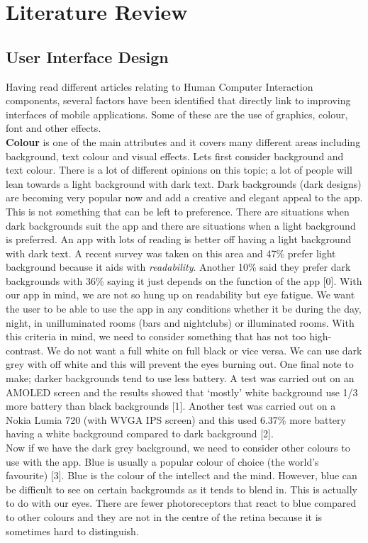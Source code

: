 \section{Literature Review}

\subsection{User Interface Design}
Having read different articles relating to Human Computer Interaction components, several factors have been identified that directly link to improving interfaces of mobile applications.  Some of these are the use of graphics, colour, font and other effects.  \\
\textbf{Colour} is one of the main attributes and it covers many different areas including background, text colour and visual effects.  Lets first consider background and text colour.  There is a lot of different opinions on this topic; a lot of people will lean towards a light background with dark text.  Dark backgrounds (dark designs) are becoming very popular now and add a creative and elegant appeal to the app.  This is not something that can be left to preference.  There are situations when dark backgrounds suit the app and there are situations when a light background is preferred.  An app with lots of reading is better off having a light background with dark text.  A recent survey was taken on this area and 47\% prefer light background because it aids with \emph{readability}.   Another 10\% said they prefer dark backgrounds with 36\% saying it just depends on the function of the app [0].  With our app in mind, we are not so hung up on readability but eye fatigue.  We want the user to be able to use the app in any conditions whether it be during the day, night, in unilluminated rooms (bars and nightclubs) or illuminated rooms.  With this criteria in mind, we need to consider something that has not too high-contrast.  We do not want a full white on full black or vice versa.  We can use dark grey with off white and this will prevent the eyes burning out.  One final note to make; darker backgrounds tend to use less battery.  A test was carried out on an AMOLED screen and the results showed that `mostly' white background use 1/3 more battery than black backgrounds [1].  Another test was carried out on a Nokia Lumia 720 (with WVGA IPS screen) and this used 6.37\% more battery having a white background compared to dark background [2].  \\
Now if we have the dark grey background, we need to consider other colours to use with the app.  Blue is usually a popular colour of choice (the world's favourite) [3].  Blue is the colour of the intellect and the mind.  However, blue can be difficult to see on certain backgrounds as it tends to blend in.  This is actually to do with our eyes.  There are fewer photoreceptors that react to blue compared to other colours and they are not in the centre of the retina because it is sometimes hard to distinguish.  \\

